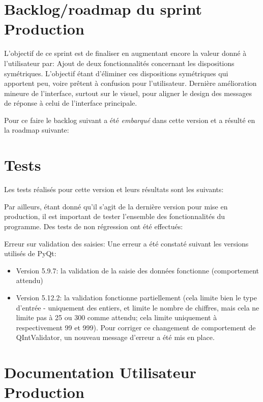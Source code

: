 \section{Backlog/roadmap du sprint Production}

L’objectif de ce sprint est de finaliser en augmentant encore la valeur donné à l'utilisateur par: 
Ajout de deux fonctionnalités concernant les dispositions symétriques. L’objectif étant d'éliminer ces dispositions symétriques qui apportent peu, voire prêtent à confusion pour l’utilisateur.
Dernière amélioration mineure de l’interface, surtout sur le visuel, pour aligner le design des messages de réponse à celui de l’interface principale.

Pour ce faire le backlog suivant a été \emph{embarqué} dans cette version et a résulté en la roadmap suivante:

\section{Tests}

Les tests réalisés pour cette version et leurs résultats sont les suivants:


Par ailleurs, étant donné qu’il s’agit de la dernière version pour mise en production, 
il est important de tester l’ensemble des fonctionnalités du programme. Des tests de non régression 
ont été effectués:


Erreur sur validation des saisies:
Une erreur a été constaté suivant les versions utilisés de PyQt:
\begin{itemize}
    \item Version 5.9.7: la validation de la saisie des données fonctionne (comportement attendu)
    \item Version 5.12.2: la validation fonctionne partiellement (cela limite bien le type d'entrée - uniquement des entiers, et limite le nombre de chiffres, mais cela ne limite pas à 25 ou 300 comme attendu; cela limite uniquement à respectivement 99 et 999). Pour corriger ce changement de comportement de QIntValidator, un nouveau message d’erreur a été mis en place.
\end{itemize}

\section{Documentation Utilisateur Production}

